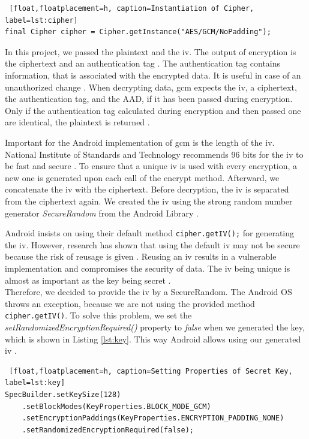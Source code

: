 \begin{lstlisting} [float,floatplacement=h, caption=Instantiation of Cipher, label=lst:cipher]
final Cipher cipher = Cipher.getInstance("AES/GCM/NoPadding");
\end{lstlisting}

In this project, we passed the plaintext and the \gls{iv}. The output of encryption is the ciphertext and an authentication tag \cite{dworkin2007sp}. The authentication tag contains information, that is associated with the encrypted data. It is useful in case of an unauthorized change \cite{AESJavaAndroid}. When decrypting data, \gls{gcm} expects the \gls{iv}, a ciphertext, the authentication tag, and the AAD, if it has been passed during encryption. Only if the authentication tag calculated during encryption and then passed one are identical, the plaintext is returned \cite{dworkin2007sp}.

Important for the Android implementation of \gls{gcm} is the length of the \gls{iv}. National Institute of Standards and Technology recommends 96 bits for the \gls{iv} to be fast and secure \cite{dworkin2007sp}. To ensure that a unique \gls{iv} is used with every encryption, a new one is generated upon each call of the encrypt method. Afterward, we concatenate the \gls{iv} with the ciphertext. Before decryption, the \gls{iv} is separated from the ciphertext again. We created the \gls{iv} using the strong random number generator \textit{SecureRandom} from the Android Library \cite{SecureRandom}.

Android insists on using their default method \texttt{cipher.getIV();} for generating the \gls{iv}. However, research has shown that using the default \gls{iv} may not be secure because the risk of reusage is given \cite{DefaultIV}. Reusing an \gls{iv} results in a vulnerable implementation and compromises the security of data. The \gls{iv} being unique is almost as important as the key being secret \cite{dworkin2007sp}. \\
Therefore, we decided to provide the \gls{iv} by a SecureRandom. The Android OS throws an exception, because we are not using the provided method \texttt{cipher.getIV()}. To solve this problem, we set the \textit{setRandomizedEncryptionRequired()} property to \textit{false} when we generated the key, which is shown in Listing \ref{lst:key}. This way Android allows using our generated \gls{iv} \cite{SecretsInAndroid}.

\begin{lstlisting} [float,floatplacement=h, caption=Setting Properties of Secret Key, label=lst:key]
SpecBuilder.setKeySize(128)
    .setBlockModes(KeyProperties.BLOCK_MODE_GCM)
    .setEncryptionPaddings(KeyProperties.ENCRYPTION_PADDING_NONE)
    .setRandomizedEncryptionRequired(false);
\end{lstlisting}

